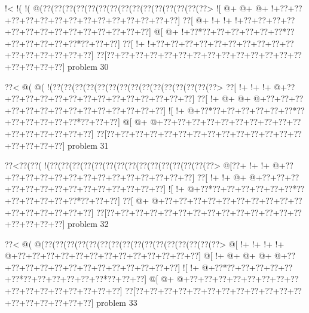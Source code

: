 \vbox{\vbox{\goo
\- !<\- !(\- !(\- @(\0??(\0??(\0??(\0??(\0??(\0??(\0??(\0??(\0??(\0??(\0??(\0??(\0??(\0??(\0??>
\- ![\- @+\- @+\- @+\- !+\0??+\0??+\0??+\0??+\0??+\0??+\0??+\0??+\0??+\0??+\0??+\0??+\0??+\0??]
\0??[\- @+\- !+\- !+\- !+\0??+\0??+\0??+\0??+\0??+\0??+\0??+\0??+\0??+\0??+\0??+\0??+\0??+\0??]
\- @[\- @+\- !+\0??*\0??+\0??+\0??+\0??+\0??+\0??*\0??+\0??+\0??+\0??+\0??+\0??*\0??+\0??+\0??]
\0??[\- !+\- !+\0??+\0??+\0??+\0??+\0??+\0??+\0??+\0??+\0??+\0??+\0??+\0??+\0??+\0??+\0??+\0??]
\0??[\0??+\0??+\0??+\0??+\0??+\0??+\0??+\0??+\0??+\0??+\0??+\0??+\0??+\0??+\0??+\0??+\0??+\0??]
}
\hfil problem 30\hfil\break
}



\vbox{\vbox{\goo
\0??<\- @(\- @(\- !(\0??(\0??(\0??(\0??(\0??(\0??(\0??(\0??(\0??(\0??(\0??(\0??(\0??(\0??(\0??>
\0??[\- !+\- !+\- !+\- @+\0??+\0??+\0??+\0??+\0??+\0??+\0??+\0??+\0??+\0??+\0??+\0??+\0??+\0??]
\0??[\- !+\- @+\- @+\- @+\0??+\0??+\0??+\0??+\0??+\0??+\0??+\0??+\0??+\0??+\0??+\0??+\0??+\0??]
\- ![\- !+\- @+\0??*\0??+\0??+\0??+\0??+\0??+\0??*\0??+\0??+\0??+\0??+\0??+\0??*\0??+\0??+\0??]
\- @[\- @+\- @+\0??+\0??+\0??+\0??+\0??+\0??+\0??+\0??+\0??+\0??+\0??+\0??+\0??+\0??+\0??+\0??]
\0??[\0??+\0??+\0??+\0??+\0??+\0??+\0??+\0??+\0??+\0??+\0??+\0??+\0??+\0??+\0??+\0??+\0??+\0??]
}
\hfil problem 31\hfil\break
}



\vbox{\vbox{\goo
\0??<\0??(\0??(\- !(\0??(\0??(\0??(\0??(\0??(\0??(\0??(\0??(\0??(\0??(\0??(\0??(\0??(\0??(\0??>
\- @[\0??+\- !+\- !+\- @+\0??+\0??+\0??+\0??+\0??+\0??+\0??+\0??+\0??+\0??+\0??+\0??+\0??+\0??]
\0??[\- !+\- !+\- @+\- @+\0??+\0??+\0??+\0??+\0??+\0??+\0??+\0??+\0??+\0??+\0??+\0??+\0??+\0??]
\- ![\- !+\- @+\0??*\0??+\0??+\0??+\0??+\0??+\0??*\0??+\0??+\0??+\0??+\0??+\0??*\0??+\0??+\0??]
\0??[\- @+\- @+\0??+\0??+\0??+\0??+\0??+\0??+\0??+\0??+\0??+\0??+\0??+\0??+\0??+\0??+\0??+\0??]
\0??[\0??+\0??+\0??+\0??+\0??+\0??+\0??+\0??+\0??+\0??+\0??+\0??+\0??+\0??+\0??+\0??+\0??+\0??]
}
\hfil problem 32\hfil\break
}



\vbox{\vbox{\goo
\0??<\- @(\- @(\0??(\0??(\0??(\0??(\0??(\0??(\0??(\0??(\0??(\0??(\0??(\0??(\0??(\0??(\0??(\0??>
\- @[\- !+\- !+\- !+\- !+\- @+\0??+\0??+\0??+\0??+\0??+\0??+\0??+\0??+\0??+\0??+\0??+\0??+\0??]
\- @[\- !+\- @+\- @+\- @+\- @+\0??+\0??+\0??+\0??+\0??+\0??+\0??+\0??+\0??+\0??+\0??+\0??+\0??]
\- ![\- !+\- @+\0??*\0??+\0??+\0??+\0??+\0??+\0??*\0??+\0??+\0??+\0??+\0??+\0??*\0??+\0??+\0??]
\- @[\- @+\- @+\0??+\0??+\0??+\0??+\0??+\0??+\0??+\0??+\0??+\0??+\0??+\0??+\0??+\0??+\0??+\0??]
\0??[\0??+\0??+\0??+\0??+\0??+\0??+\0??+\0??+\0??+\0??+\0??+\0??+\0??+\0??+\0??+\0??+\0??+\0??]
}
\hfil problem 33\hfil\break
}



